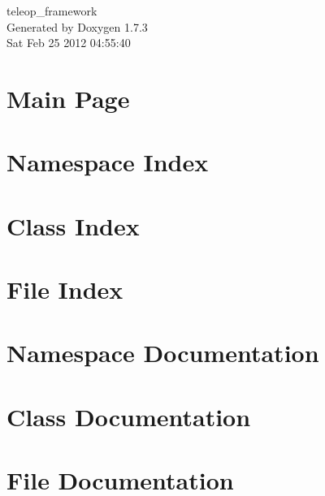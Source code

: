 \documentclass[a4paper]{book}
\begin{document}
\begin{titlepage}
\vspace*{7cm}
\begin{center}
{\Large teleop\_\-framework }\\
\vspace*{1cm}
{\large Generated by Doxygen 1.7.3}\\
\vspace*{0.5cm}
{\small Sat Feb 25 2012 04:55:40}\\
\end{center}
\end{titlepage}
\clearemptydoublepage
{}
\tableofcontents
\clearemptydoublepage
{}
\chapter{Main Page}
\label{index}
\chapter{Namespace Index}

\chapter{Class Index}

\chapter{File Index}

\chapter{Namespace Documentation}

\chapter{Class Documentation}






\chapter{File Documentation}






\printindex
\end{document}

